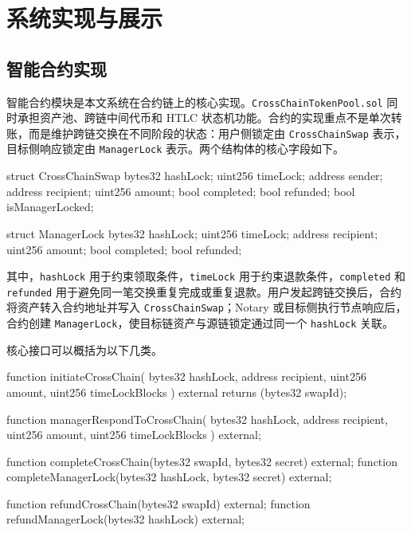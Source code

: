 
\chapter{系统实现与展示}


\section{智能合约实现}


智能合约模块是本文系统在合约链上的核心实现。\texttt{CrossChainTokenPool.sol} 同时承担资产池、跨链中间代币和 HTLC 状态机功能。合约的实现重点不是单次转账，而是维护跨链交换在不同阶段的状态：用户侧锁定由 \texttt{CrossChainSwap} 表示，目标侧响应锁定由 \texttt{ManagerLock} 表示。两个结构体的核心字段如下。


\begin{codeblock}[language=Solidity]
struct CrossChainSwap {
    bytes32 hashLock;
    uint256 timeLock;
    address sender;
    address recipient;
    uint256 amount;
    bool completed;
    bool refunded;
    bool isManagerLocked;
}

struct ManagerLock {
    bytes32 hashLock;
    uint256 timeLock;
    address recipient;
    uint256 amount;
    bool completed;
    bool refunded;
}
\end{codeblock}


其中，\texttt{hashLock} 用于约束领取条件，\texttt{timeLock} 用于约束退款条件，\texttt{completed} 和 \texttt{refunded} 用于避免同一笔交换重复完成或重复退款。用户发起跨链交换后，合约将资产转入合约地址并写入 \texttt{CrossChainSwap}；Notary 或目标侧执行节点响应后，合约创建 \texttt{ManagerLock}，使目标链资产与源链锁定通过同一个 \texttt{hashLock} 关联。


核心接口可以概括为以下几类。


\begin{codeblock}[language=Solidity]
function initiateCrossChain(
    bytes32 hashLock,
    address recipient,
    uint256 amount,
    uint256 timeLockBlocks
) external returns (bytes32 swapId);

function managerRespondToCrossChain(
    bytes32 hashLock,
    address recipient,
    uint256 amount,
    uint256 timeLockBlocks
) external;

function completeCrossChain(bytes32 swapId, bytes32 secret) external;
function completeManagerLock(bytes32 hashLock, bytes32 secret) external;

function refundCrossChain(bytes32 swapId) external;
function refundManagerLock(bytes32 hashLock) external;
\end{codeblock}



